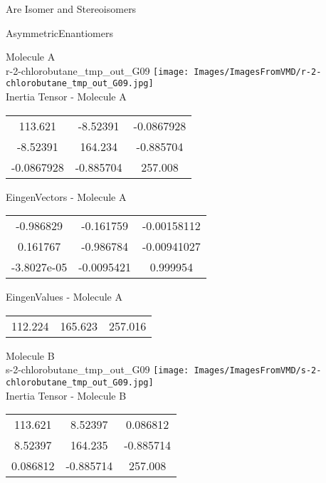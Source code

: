 \begin{center}
\vtab
\vtab
\textcolor{NavyBlue}{\Large Are Isomer and Stereoisomers}
\end{center}
\newpage

\vtab[-2cm]
\begin{center}
{\large AsymmetricEnantiomers}
\end{center}
\begin{multicols}{2}
\begin{center}
Molecule A \\ 
r-2-chlorobutane\_tmp\_out\_G09
\texttt{[image: Images/ImagesFromVMD/r-2-chlorobutane\_tmp\_out\_G09.jpg]}
\\
Inertia Tensor - Molecule A \\
\vtab
\begin{tabular}{|c c c|}
113.621	 & 	-8.52391	 & 	-0.0867928	 \\
-8.52391	 & 	164.234	 & 	-0.885704	 \\
-0.0867928	 & 	-0.885704	 & 	257.008
\end{tabular}

\vtab
 EingenVectors - Molecule A     \\
\vtab
\begin{tabular}{|c c c|}
-0.986829	 & 	-0.161759	 & 	-0.00158112	 \\
0.161767	 & 	-0.986784	 & 	-0.00941027	 \\
-3.8027e-05	 & 	-0.0095421	 & 	0.999954
\end{tabular}

\vtab
 EingenValues - Molecule A     \\
\vtab
\begin{tabular}{|c c c|}
112.224	 & 	165.623	 & 	257.016
\end{tabular}
\columnbreak

Molecule B \\ 
s-2-chlorobutane\_tmp\_out\_G09
\texttt{[image: Images/ImagesFromVMD/s-2-chlorobutane\_tmp\_out\_G09.jpg]}
\\
Inertia Tensor - Molecule B \\
\vtab
\begin{tabular}{|c c c|}
113.621	 & 	8.52397	 & 	0.086812	 \\
8.52397	 & 	164.235	 & 	-0.885714	 \\
0.086812	 & 	-0.885714	 & 	257.008
\end{tabular}


\end{center}
\end{multicols}
